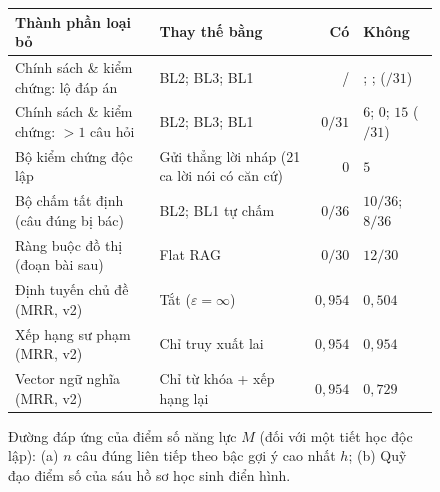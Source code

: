 \documentclass[10pt,a4paper,twocolumn]{article}
\begin{document}
\begin{figure}[t]
\centering

\caption{Đường đáp ứng của điểm số năng lực $M$ (đối với một tiết học độc lập): (a) $n$ câu đúng liên tiếp theo bậc gợi ý cao nhất $h$; (b) Quỹ đạo điểm số của sáu hồ sơ học sinh điển hình.}\label{fig:curves}
\vspace{4pt}
\begin{minipage}[t]{0.51\textwidth}\vspace{0pt}
\label{tab:components}
\footnotesize
\begin{tabular}{@{}>{\raggedright\arraybackslash}p{2.4cm}>{\raggedright\arraybackslash}p{1.6cm}rp{1.9cm}@{}}
\toprule
Thành phần loại bỏ & Thay thế bằng & Có & Không \\
\midrule
Chính sách \& kiểm chứng: lộ đáp án & BL2; BL3; BL1 & \CavLeaks{}/\CavTurns{} & \BtwoLeaks{}; \BthreeLeaks{}; \BoneLeaks{} ($/31$) \\
Chính sách \& kiểm chứng: $>1$ câu hỏi & BL2; BL3; BL1 & $0/31$ & $6$; $0$; $15$ ($/31$) \\
Bộ kiểm chứng độc lập & Gửi thẳng lời nháp (21 ca lời nói có căn cứ) & $0$ & $5$ \\
Bộ chấm tất định (câu đúng bị bác) & BL2; BL1 tự chấm & $0/36$ & $10/36$; $8/36$ \\
Ràng buộc đồ thị (đoạn bài sau) & Flat RAG & $0/30$ & $12/30$ \\
Định tuyến chủ đề (MRR, v2) & Tắt ($\varepsilon=\infty$) & $0{,}954$ & $0{,}504$ \\
Xếp hạng sư phạm (MRR, v2) & Chỉ truy xuất lai & $0{,}954$ & $0{,}954$ \\
Vector ngữ nghĩa (MRR, v2) & Chỉ từ khóa + xếp hạng lại & $0{,}954$ & $0{,}729$ \\
\bottomrule
\end{tabular}
\end{minipage}\hfill
\begin{minipage}[t]{0.47\textwidth}\vspace{0pt}
\label{tab:ablation}

\vspace{3pt}
\label{tab:setup}

\end{minipage}
\end{figure}
\end{document}
